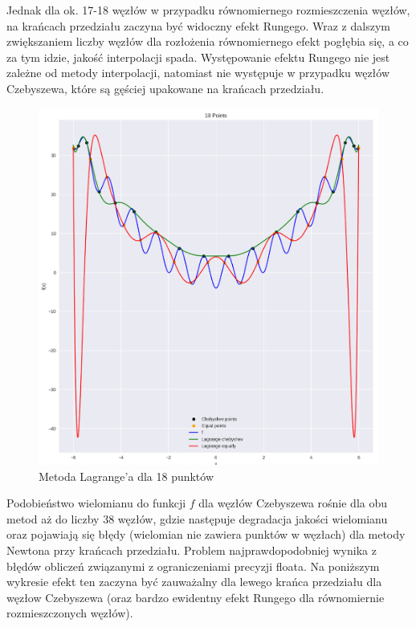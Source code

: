 \documentclass{article}
\begin{document}
Jednak dla ok. 17-18 węzłów w przypadku równomiernego rozmieszczenia węzłów, na krańcach przedziału zaczyna być widoczny efekt 
Rungego. Wraz z dalszym zwiększaniem liczby węzłów dla rozłożenia równomiernego efekt pogłębia się, a co za tym idzie,
jakość interpolacji spada. Występowanie efektu Rungego nie jest zależne od metody interpolacji, natomiast nie występuje w przypadku węzłów 
Czebyszewa, które są gęściej upakowane na krańcach przedziału.

\begin{figure}[H]
    \centering
    \includegraphics[width=\textwidth]{img/lagr_18.png}
    \caption{Metoda Lagrange'a dla 18 punktów}
\end{figure}

Podobieństwo wielomianu do funkcji $f$ dla węzłów Czebyszewa rośnie dla obu metod aż do liczby 38 węzłów, gdzie następuje degradacja
jakości wielomianu oraz pojawiają się błędy (wielomian nie zawiera punktów w węzłach) dla metody Newtona przy krańcach przedziału. Problem 
najprawdopodobniej wynika z błędów obliczeń związanymi z ograniczeniami precyzji floata. Na poniższym wykresie efekt ten zaczyna być zauważalny dla lewego krańca
przedziału dla węzłow Czebyszewa (oraz bardzo ewidentny efekt Rungego dla równomiernie rozmieszczonych węzłów).
\end{document}
